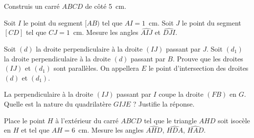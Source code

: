 \begin{myenumerate}
\item Construis un carré $ABCD$ de côté 5~cm.
\item Soit $I$ le point du segment $[AB)$ tel que $AI=1$~cm. Soit $J$
le point du segment $[CD]$ tel que $CJ=1$~cm. Mesure les angles
$\widehat{AIJ}$ et $\widehat{DJI}$.
\item Soit $(d)$ la droite perpendiculaire à la droite $(IJ)$ passant
par $J$. Soit $(d_1)$ la droite perpendiculaire à la droite $(d)$
passant par $B$. Prouve que les droites $(IJ)$ et $(d_1)$ sont
parallèles. On appellera $E$ le point d'intersection des droites $(d)$
et $(d_1)$.
\item La perpendiculaire à la droite $(IJ)$ passant par $I$ coupe la
droite $(FB)$ en $G$. Quelle est la nature du quadrilatère $GIJE$ ?
Justifie la réponse.
\item Place le point $H$ à l'extérieur du carré $ABCD$ tel que le
triangle $AHD$ soit isocèle en $H$ et tel que $AH=6$~cm. Mesure les
angles $\widehat{AHD}$, $\widehat{HDA}$, $\widehat{HAD}$.
\end{myenumerate}